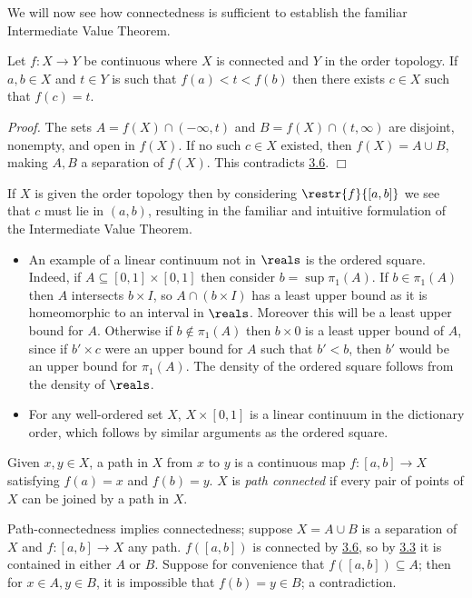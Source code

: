 We will now see how connectedness is sufficient to establish the familiar Intermediate Value Theorem.

\begin{theorem}\label{3.11}
    Let $f: X \rightarrow Y$ be continuous where $X$ is connected and $Y$ in the order topology. If $a, b \in X$ and $t \in Y$ is such that $f(a) < t < f(b)$ then there exists $c \in X$ such that $f(c) = t$.
\end{theorem}
{\it Proof.} The sets $A = f(X) \cap (-\infty, t)$ and $B= f(X) \cap (t, \infty)$ are disjoint, nonempty, and open in $f(X)$. If no such $c \in X$ existed, then $f(X) = A \cup B$, making $A, B$ a separation of $f(X)$. This contradicts \hyperref[3.6]{3.6}. $\Box$

If $X$ is given the order topology then by considering $\restr{f}{[a, b]}$ we see that $c$ must lie in $(a, b)$, resulting in the familiar and intuitive formulation of the Intermediate Value Theorem.


\begin{itemize}
    \item An example of a linear continuum not in $\reals$ is the ordered square. Indeed, if $A \subseteq [0, 1] \times [0, 1]$ then consider $b = \sup \pi_1(A)$. If $b \in \pi_1(A)$ then $A$ intersects $b \times I$, so $A \cap (b \times I)$ has a least upper bound as it is homeomorphic to an interval in $\reals$. Moreover this will be a least upper bound for $A$. Otherwise if $b \notin \pi_1(A)$ then $b \times 0$ is a least upper bound of $A$, since if $b' \times c$ were an upper bound for $A$ such that $b' < b$, then $b'$ would be an upper bound for $\pi_1(A)$. The density of the ordered square follows from the density of $\reals$.

    \item For any well-ordered set $X$, $X \times [0, 1]$ is a linear continuum in the dictionary order, which follows by similar arguments as the ordered square.

\end{itemize}

\begin{definition}\label{3.12}
    Given $x, y\in X$, a path in $X$ from $x$ to $y$ is a continuous map $f: [a, b] \rightarrow X$ satisfying $f(a) = x$ and $f(b) = y$. $X$ is {\it path connected} if every pair of points of $X$ can be joined by a path in $X$.
\end{definition}

Path-connectedness implies connectedness; suppose $X = A \cup B$ is a separation of $X$ and $f: [a, b] \rightarrow X$ any path. $f([a, b])$ is connected by \hyperref[3.6]{3.6}, so by \hyperref[3.3]{3.3} it is contained in either $A$ or $B$. Suppose for convenience that $f([a, b]) \subseteq A$; then for $x \in A, y \in B$, it is impossible that $f(b) = y \in B$; a contradiction.

